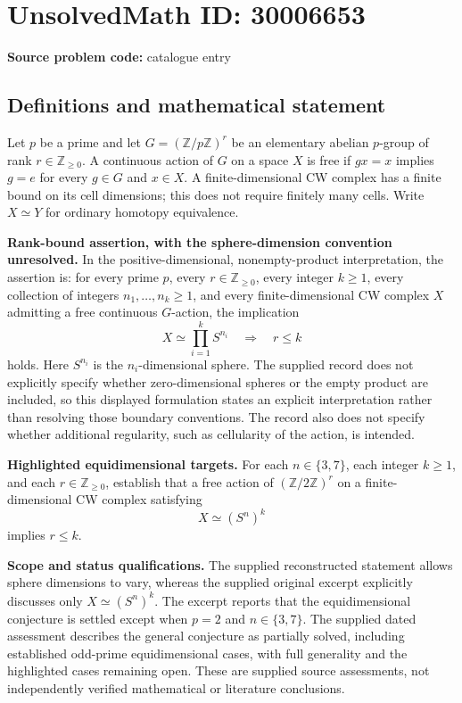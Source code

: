 \documentclass[11pt]{article}
\newcommand{\Z}{\mathbb{Z}}
\begin{document}
\section*{UnsolvedMath ID: 30006653}
\textbf{Source problem code:} catalogue entry
\subsection{Definitions and mathematical statement}
Let \(p\) be a prime and let \(G=(\Z/p\Z)^r\) be an elementary abelian \(p\)-group of rank \(r\in\Z_{\geq 0}\). A continuous action of \(G\) on a space \(X\) is free if \(gx=x\) implies \(g=e\) for every \(g\in G\) and \(x\in X\). A finite-dimensional CW complex has a finite bound on its cell dimensions; this does not require finitely many cells. Write \(X\simeq Y\) for ordinary homotopy equivalence.

\textbf{Rank-bound assertion, with the sphere-dimension convention unresolved.} In the positive-dimensional, nonempty-product interpretation, the assertion is: for every prime \(p\), every \(r\in\Z_{\geq 0}\), every integer \(k\geq 1\), every collection of integers \(n_1,\ldots,n_k\geq 1\), and every finite-dimensional CW complex \(X\) admitting a free continuous \(G\)-action, the implication
\[
X\simeq\prod_{i=1}^{k}S^{n_i}
\quad\Longrightarrow\quad r\leq k
\]
holds. Here \(S^{n_i}\) is the \(n_i\)-dimensional sphere. The supplied record does not explicitly specify whether zero-dimensional spheres or the empty product are included, so this displayed formulation states an explicit interpretation rather than resolving those boundary conventions. The record also does not specify whether additional regularity, such as cellularity of the action, is intended.

\textbf{Highlighted equidimensional targets.} For each \(n\in\{3,7\}\), each integer \(k\geq 1\), and each \(r\in\Z_{\geq 0}\), establish that a free action of \((\Z/2\Z)^r\) on a finite-dimensional CW complex satisfying
\[
X\simeq(S^n)^k
\]
implies \(r\leq k\).

\textbf{Scope and status qualifications.} The supplied reconstructed statement allows sphere dimensions to vary, whereas the supplied original excerpt explicitly discusses only \(X\simeq(S^n)^k\). The excerpt reports that the equidimensional conjecture is settled except when \(p=2\) and \(n\in\{3,7\}\). The supplied dated assessment describes the general conjecture as partially solved, including established odd-prime equidimensional cases, with full generality and the highlighted cases remaining open. These are supplied source assessments, not independently verified mathematical or literature conclusions.
\end{document}
